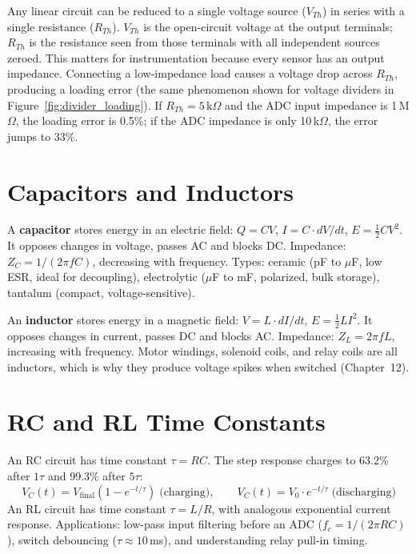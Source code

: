\documentclass[11pt,letterpaper,twoside,openany]{book}
\begin{document}
Any linear circuit can be reduced to a single voltage source ($V_{Th}$) in series with a single resistance ($R_{Th}$). $V_{Th}$ is the open-circuit voltage at the output terminals; $R_{Th}$ is the resistance seen from those terminals with all independent sources zeroed. This matters for instrumentation because every sensor has an output impedance. Connecting a low-impedance load causes a voltage drop across $R_{Th}$, producing a loading error (the same phenomenon shown for voltage dividers in Figure~\ref{fig:divider_loading}). If $R_{Th} = 5\,\text{k}\Omega$ and the ADC input impedance is 1\,M$\Omega$, the loading error is 0.5\%; if the ADC impedance is only 10\,k$\Omega$, the error jumps to 33\%.


\section{Capacitors and Inductors}

A \textbf{capacitor} stores energy in an electric field: $Q = CV$, $I = C \cdot dV/dt$, $E = \frac{1}{2}CV^2$. It opposes changes in voltage, passes AC and blocks DC. Impedance: $Z_C = 1/(2\pi f C)$, decreasing with frequency. Types: ceramic (pF to $\mu$F, low ESR, ideal for decoupling), electrolytic ($\mu$F to mF, polarized, bulk storage), tantalum (compact, voltage-sensitive).

An \textbf{inductor} stores energy in a magnetic field: $V = L \cdot dI/dt$, $E = \frac{1}{2}LI^2$. It opposes changes in current, passes DC and blocks AC. Impedance: $Z_L = 2\pi f L$, increasing with frequency. Motor windings, solenoid coils, and relay coils are all inductors, which is why they produce voltage spikes when switched (Chapter~12).


\section{RC and RL Time Constants}

An RC circuit has time constant $\tau = RC$. The step response charges to 63.2\% after $1\tau$ and 99.3\% after $5\tau$:
\begin{equation}
V_C(t) = V_{\text{final}}\left(1 - e^{-t/\tau}\right) \;\text{(charging)}, \qquad V_C(t) = V_0 \cdot e^{-t/\tau} \;\text{(discharging)}
\end{equation}
An RL circuit has time constant $\tau = L/R$, with analogous exponential current response. Applications: low-pass input filtering before an ADC ($f_c = 1/(2\pi RC)$), switch debouncing ($\tau \approx 10$\,ms), and understanding relay pull-in timing.
\end{document}
